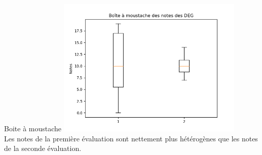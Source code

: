 \documentclass[10pt, french]{beamer}
\begin{document}
\begin{frame}{Boite à moustache}
\includegraphics[width=3.5in]{Images/boite.png}\\
Les notes  de la première évaluation sont nettement plus hétérogènes que les notes de la seconde évaluation.  
\end{frame}
\end{document}
